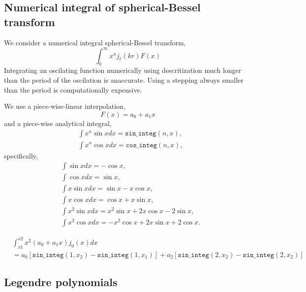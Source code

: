 \documentclass[a4paper,11pt, fleqn]{article}
\begin{document}
\clearpage
\subsection{Numerical integral of spherical-Bessel transform}

We consider a numerical integral spherical-Bessel transform,
%
\begin{equation}
  \int_0^\infty x^n j_\ell(kr) F(x)
\end{equation}
%
Integrating an oscilating function numerically using descritization
much longer than the period of the oscilation is anaccurate. Using a
stepping always smaller than the period is computationally
expensive.

We use a piece-wise-linear interpolation,
%
\begin{equation}
  F(x) = a_0 + a_1 x
\end{equation}
%
and a piece-wise analytical integral,
%
\begin{align}
  &\int x^n \sin x dx = \texttt{sin\_integ}(n, x),\\
  &\int x^n \cos x dx = \texttt{cos\_integ}(n, x),
\end{align}
%
specifically,
%
\begin{align}
  &\int \sin x dx = -\cos x,\\
  &\int \cos x dx = \sin x,\\
  &\int x \sin x dx = \sin x - x \cos x,\\
  &\int x \cos x dx = \cos x + x \sin x,\\
  &\int x^2 \sin x dx = x^2 \sin x + 2 x \cos x - 2 \sin x,\\
  &\int x^2 \cos x dx = -x^2 \cos x + 2 x \sin x + 2 \cos x.
\end{align}
%

\vspace{5mm}

\begin{equation}\begin{split}
    &\int_{x1}^{x2} x^2 (a_0 + a_1 x) j_0(x) dx \\
    &=
    a_0 [\texttt{sin\_integ}(1, x_2) - \texttt{sin\_integ}(1, x_1)]
    + a_2 [\texttt{sin\_integ}(2, x_2) - \texttt{sin\_integ}(2, x_2)]
\end{split}\end{equation}

\clearpage
\subsection{Legendre polynomials}
\label{sec:legendre}
\end{document}
